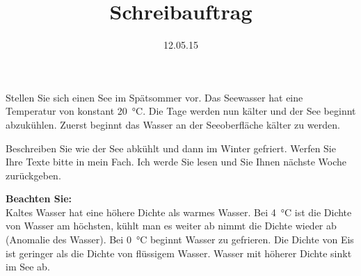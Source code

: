 \documentclass[12pt,a5paper]{article}
\title{Schreibauftrag}
\date{12.05.15}
\begin{document}
\maketitle


Stellen Sie sich einen See im Spätsommer vor.
Das Seewasser hat eine Temperatur von konstant \SI{20}{\celsius}.
Die Tage werden nun kälter und der See beginnt abzukühlen.
Zuerst beginnt das Wasser an der Seeoberfläche kälter zu werden.

Beschreiben Sie wie der See abkühlt und dann im Winter gefriert.
Werfen Sie Ihre Texte bitte in mein Fach. Ich werde Sie lesen und Sie Ihnen nächste Woche zurückgeben.


\textbf{Beachten Sie:}\\
Kaltes Wasser hat eine höhere Dichte als warmes Wasser.
Bei \SI{4}{\celsius} ist die Dichte von Wasser am höchsten, kühlt man es weiter ab nimmt die Dichte wieder ab (Anomalie des Wasser).
Bei \SI{0}{\celsius} beginnt Wasser zu gefrieren. Die Dichte von Eis ist geringer als die Dichte von flüssigem Wasser.
Wasser mit höherer Dichte sinkt im See ab.
\end{document}
